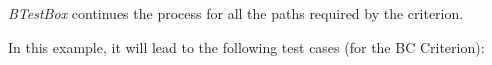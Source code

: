\documentclass[runningheads]{llncs}
\begin{document}

\textit{BTestBox} continues the process for all the paths required by the criterion.




In this example, it will lead to the following test cases (for the BC Criterion):




\end{document}
